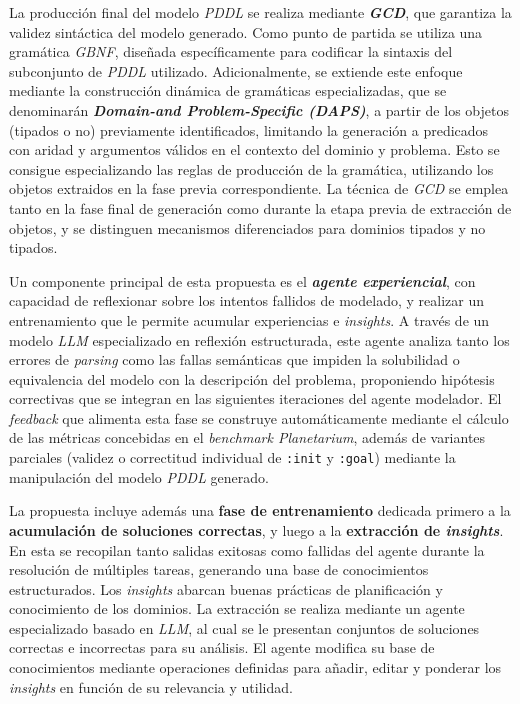 La producción final del modelo \textit{PDDL} se realiza mediante \textbf{\textit{GCD}}, que garantiza la validez sintáctica del modelo generado. Como punto de partida se utiliza una gramática \textit{GBNF}, diseñada específicamente para codificar la sintaxis del subconjunto de \textit{PDDL} utilizado. Adicionalmente, se extiende este enfoque mediante la construcción dinámica de gramáticas especializadas, que se denominarán \textbf{\textit{Domain-and Problem-Specific (DAPS)}}, a partir de los objetos (tipados o no) previamente identificados, limitando la generación a predicados con aridad y argumentos válidos en el contexto del dominio y problema. Esto se consigue especializando las reglas de producción de la gramática, utilizando los objetos extraidos en la fase previa correspondiente. La técnica de \textit{GCD} se emplea tanto en la fase final de generación como durante la etapa previa de extracción de objetos, y se distinguen mecanismos diferenciados para dominios tipados y no tipados.

Un componente principal de esta propuesta es el \textbf{\textit{agente experiencial}}, con capacidad de reflexionar sobre los intentos fallidos de modelado, y realizar un entrenamiento que le permite acumular experiencias e \textit{insights}. A través de un modelo \textit{LLM} especializado en reflexión estructurada, este agente analiza tanto los errores de \textit{parsing} como las fallas semánticas que impiden la solubilidad o equivalencia del modelo con la descripción del problema, proponiendo hipótesis correctivas que se integran en las siguientes iteraciones del agente modelador. El \textit{feedback} que alimenta esta fase se construye automáticamente mediante el cálculo de las métricas concebidas en el \textit{benchmark Planetarium}, además de variantes parciales (validez o correctitud individual de \texttt{:init} y \texttt{:goal}) mediante la manipulación del modelo \textit{PDDL} generado.

La propuesta incluye además una \textbf{fase de entrenamiento} dedicada primero a la \textbf{acumulación de soluciones correctas}, y luego a la \textbf{extracción de \textit{insights}}. En esta se recopilan tanto salidas exitosas como fallidas del agente durante la resolución de múltiples tareas, generando una base de conocimientos estructurados. Los \textit{insights} abarcan buenas prácticas de planificación y conocimiento de los dominios. La extracción se realiza mediante un agente especializado basado en \textit{LLM}, al cual se le presentan conjuntos de soluciones correctas e incorrectas para su análisis. El agente modifica su base de conocimientos mediante operaciones definidas para añadir, editar y ponderar los \textit{insights} en función de su relevancia y utilidad.

